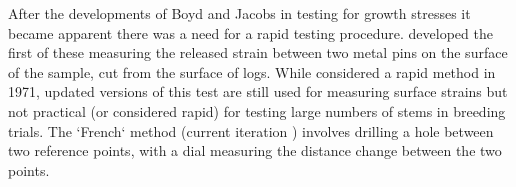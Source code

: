 After the developments of Boyd and Jacobs in testing for growth stresses it
became apparent there was a need for a rapid testing procedure. \cite{Nicholson_1971}
developed the first of these measuring the released strain between two metal pins
on the surface of the sample, cut from the surface of logs. While considered a
rapid method in 1971, updated versions of this test are still used for measuring
surface strains but not practical (or considered rapid) for testing large
numbers of stems in breeding trials. The `French` method (current
iteration \cite{Baill_res_1995}) involves drilling a hole between two reference
points, with a dial measuring the distance change between the two points.